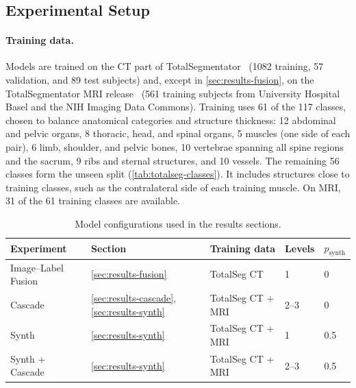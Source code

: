 \documentclass[hidelinks, a4paper, 12pt, ngerman, english]{article}  %
\begin{document}
\section{}\label{sec:results}

\subsection{Experimental Setup}\label{sec:results-setup}

\paragraph{Training data.}
Models are trained on the CT part of
TotalSegmentator~\cite{wasserthalTotalSegmentatorRobustSegmentation2023}
(1082 training, 57 validation, and 89 test subjects) and, except in
\autoref{sec:results-fusion}, on the TotalSegmentator MRI release~\cite{dantonoliTotalSegmentatorMRIRobust2025}
(561 training subjects from University Hospital Basel and the NIH Imaging
Data Commons). Training uses 61 of the 117 classes, chosen to balance
anatomical categories and structure thickness: 12 abdominal and pelvic organs,
8 thoracic, head, and spinal organs, 5 muscles (one side of each pair), 6 limb,
shoulder, and pelvic bones, 10 vertebrae spanning all spine regions and the sacrum, 9 ribs
and sternal structures, and 10 vessels. The remaining 56 classes form the
unseen split (\autoref{tab:totalseg-classes}). It includes structures close to training classes, such as the
contralateral side of each training muscle. On MRI, 31 of the 61 training
classes are available.


\begin{table}[t]
  \centering
  \small
  \caption{Model configurations used in the results sections.}
  \label{tab:configs}
  \begin{tabular}{@{}lllll@{}}
    \toprule
    Experiment & Section & Training data & Levels & $p_\text{synth}$  \\
    \midrule
    Image--Label Fusion & \ref{sec:results-fusion} & TotalSeg CT & 1 & 0  \\
    Cascade & \ref{sec:results-cascade}, \ref{sec:results-synth} & TotalSeg CT + MRI & 2--3 & 0 \\
    Synth & \ref{sec:results-synth} & TotalSeg CT + MRI & 1 & 0.5 \\
    Synth + Cascade & \ref{sec:results-synth} & TotalSeg CT + MRI & 2--3 & 0.5 \\
    \bottomrule
  \end{tabular}
\end{table}
\end{document}
